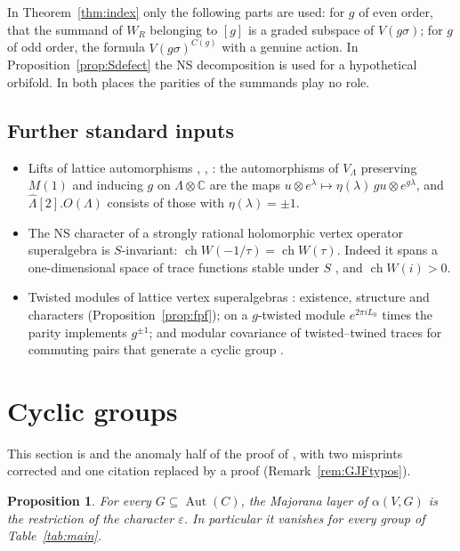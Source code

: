\documentclass[11pt]{amsart}
\newtheorem{proposition}[theorem]{Proposition}
\theoremstyle{definition}
\newcommand{\C}{\mathbb{C}}
\newcommand{\Aut}{\operatorname{Aut}}
\newcommand{\ch}{\operatorname{ch}}
\begin{document}
In Theorem~\ref{thm:index} only the following parts are used: for $g$ of even order, that the summand of
$W_R$ belonging to $[g]$ is a graded subspace of $V(g\sigma)$; for $g$ of odd order, the formula
$V(g\sigma)^{C(g)}$ with a genuine action. In Proposition~\ref{prop:Sdefect} the NS decomposition is used
for a hypothetical orbifold. In both places the parities of the summands play no role.

\subsection{Further standard inputs}\label{sec:standard}
\begin{itemize}
\item[(A8)] Lifts of lattice automorphisms \cite{Lep}, \cite[Ch.~10]{FLM}, \cite[Prop.~4.1]{BK}: the
  automorphisms of $V_\Lambda$ preserving $M(1)$ and inducing $g$ on $\Lambda\otimes\C$ are the maps
  $u\otimes e^\lambda\mapsto\eta(\lambda)\,gu\otimes e^{g\lambda}$, and $\widehat\Lambda[2].O(\Lambda)$
  consists of those with $\eta(\lambda)=\pm1$.
\item[(A9)] The NS character of a strongly rational holomorphic vertex operator superalgebra is
  $S$-invariant: $\ch W(-1/\tau)=\ch W(\tau)$. Indeed it spans a one-dimensional space of trace functions
  stable under $S$ \cite[Thms.~4.12, 7.7]{DZ}, and $\ch W(i)>0$.
\item[(A10)] Twisted modules of lattice vertex superalgebras \cite[Thm.~4.2, Rem.~4.4]{BK}: existence,
  structure and characters (Proposition~\ref{prop:fpf}); on a $g$-twisted module $e^{2\pi iL_0}$ times the
  parity implements $g^{\pm1}$; and modular covariance of twisted--twined traces for commuting pairs that
  generate a cyclic group \cite[Thms.~4.12, 7.7]{DZ}.
\end{itemize}

\section{Cyclic groups}\label{sec:cyclic}

This section is \cite[Ex.~4.4]{GJF} and the anomaly half of the proof of \cite[Thm.~5.6]{GJF}, with two
misprints corrected and one citation replaced by a proof (Remark~\ref{rem:GJFtypos}).

\begin{proposition}\label{prop:maj}
For every $G\subseteq\Aut(C)$, the Majorana layer of $\alpha(V,G)$ is the restriction of the character
$\varepsilon$. In particular it vanishes for every group of Table~\ref{tab:main}.
\end{proposition}
\end{document}
